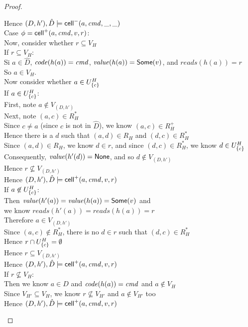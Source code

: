 \begin{proof}
\begin{tabbedproof}
\oooo Hence $(D,h'), \hat{D} \models \mathsf{cell}^{-}({a}, {\mathit{cmd}}, {\_}, {\_})$ \\
\ooo Case $\phi = \mathsf{cell}^{+}({a}, {\mathit{cmd}}, {v}, {r})$: \\
\oooo Now, consider whether $r \subseteq V_H$ \\
\oooo If $r \subseteq V_H$: \\
\ooooo Si $a \in \hat{D}$, $\mathit{code}(h(a)) = \mathit{cmd}$, 
       $\mathit{value}(h(a)) = \mathsf{Some}(v)$, and $\mathit{reads}(h(a)) = r$ \\
\ooooo So $a \in V_H$. \\
\ooooo Now consider whether $a \in U^H_{\{{c}\}}$ \\
\ooooo If $a \in U^H_{\{{c}\}}$: \\
\oooooo First, note $a \not\in V_{(D,h')}$ \\
\oooooo Next, note $(a, c) \in R^*_H$ \\
\oooooo Since $c \not= a$ (since $c$ is not in $\hat{D}$), we know $(a, c) \in R^+_H$ \\
\oooooo Hence there is a $d$ such that $(a,d) \in R_H$ and $(d, c) \in R^*_H$  \\
\oooooo Since $(a,d) \in R_H$, we know $d \in r$, and since $(d, c) \in R^*_H$, we know $d \in U^H_{\{{c}\}}$ \\
\oooooo Consequently, $\mathit{value}(h'(d)) = \mathsf{None}$, and so $d \not\in V_{(D,h')}$\\
\oooooo Hence $r \not\subseteq V_{(D, h')}$ \\
\oooooo Hence $(D,h'), \hat{D} \models \mathsf{cell}^{+}({a}, {\mathit{cmd}}, {v}, {r})$ \\
\ooooo If $a \not\in U^H_{\{{c}\}}$: \\
\oooooo Then $\mathit{value}(h'(a)) = \mathit{value}(h(a)) = \mathsf{Some}(v)$ and \\
\oooooo we know $\mathit{reads}(h'(a)) = \mathit{reads}(h(a)) = r$ \\
\oooooo Therefore $a \in V_{(D,h')}$ \\
\oooooo Since $(a, c) \not\in R^*_H$, there is no $d \in r$ such that $(d, c) \in R^*_H$  \\
\oooooo Hence $r \cap U^H_{\{{c}\}} = \emptyset$ \\
\oooooo Hence $r \subseteq V_{(D,h')}$ \\
\oooooo Hence $(D,h'), \hat{D} \models \mathsf{cell}^{+}({a}, {\mathit{cmd}}, {v}, {r})$ \\
\oooo If $r \not\subseteq V_H$: \\
\ooooo Then we know $a \in \hat{D}$ and $\mathit{code}(h(a)) = \mathit{cmd}$ and $a \not\in V_H$  \\
\ooooo Since $V_{H'} \subseteq V_H$, we know $r \not\subseteq V_{H'}$ and $a \not\in V_{H'}$ too \\
\ooooo Hence $(D,h'), \hat{D} \models \mathsf{cell}^{+}({a}, {\mathit{cmd}}, {v}, {r})$ \\


\end{tabbedproof}
\end{proof}
